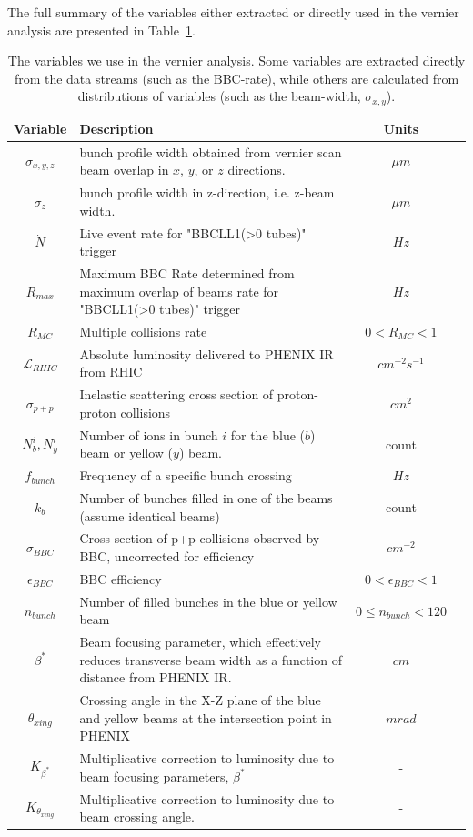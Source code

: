 {\noindent}The full summary of the variables either extracted or directly used
in the vernier analysis are presented in Table~\ref{tab:ana_vars}.

\begin{table}[ht]
  \centering
  \begin{tabular}{c p{9cm} c c }
    \toprule
    \textbf{Variable} & \textbf{Description} & \textbf{Units}  \\
    \midrule 
    $\sigma_{x,y,z} $ & bunch profile width obtained from vernier scan beam
    overlap in $x$, $y$, or $z$ directions. & $\mu m$  \\
    $\sigma_{z}$ & bunch profile width in z-direction, i.e. z-beam width. & $\mu
    m$ \\
    $\dot{N}$ & Live event rate for "BBCLL1(\textgreater0 tubes)" trigger & $Hz$
    \\
    $R_{max}$ & Maximum BBC Rate determined from maximum overlap of beams rate
    for "BBCLL1(\textgreater0 tubes)" trigger & $Hz$ \\
    $R_{MC}$ & Multiple collisions rate & $0 < R_{MC} < 1$ \\
    $\mathcal{L}_{RHIC}$ & Absolute luminosity delivered to PHENIX IR from RHIC
    & $cm^{-2}s^{-1}$ \\
    $\sigma_{p+p} $ & Inelastic scattering cross section of proton-proton
    collisions & $cm^{2}$ \\
    $N_{b}^{i},N_{y}^{i}$ & Number of ions in bunch $i$ for the blue ($b$) beam
    or yellow ($y$) beam. & count \\
    $f_{bunch}$ & Frequency of a specific bunch crossing & $Hz$ \\
    $k_{b}$ & Number of bunches filled in one of the beams (assume identical
    beams) & count \\
    $\sigma_{BBC}$ & Cross section of p+p collisions observed by BBC,
    uncorrected for efficiency & $cm^{-2}$ \\
    $\epsilon_{BBC}$ & BBC efficiency & $0 < \epsilon_{BBC} < 1 $ \\
    $n_{bunch}$ & Number of filled bunches in the blue or yellow beam & $0 \leq
    n_{bunch} < 120$ \\
    $\beta^*$ & Beam focusing parameter, which effectively reduces transverse
    beam width as a function of distance from PHENIX IR. & $cm$ \\
    $\theta_{xing}$ & Crossing angle in the X-Z plane of the blue and yellow
    beams at the intersection point in PHENIX & $mrad$ \\
    $K_{\beta^*}$ & Multiplicative correction to luminosity due to beam focusing
    parameters, $\beta^*$ & - \\
    $K_{\theta_{xing}}$ & Multiplicative correction to luminosity due to beam
    crossing angle.  & - \\
    \bottomrule
  \end{tabular}
  \caption{
    The variables we use in the vernier analysis. Some variables are extracted
    directly from the data streams (such as the BBC-rate), while others are
    calculated from distributions of variables (such as the beam-width,
    $\sigma_{x,y}$). 
  }
  \label{tab:ana_vars}
\end{table}


